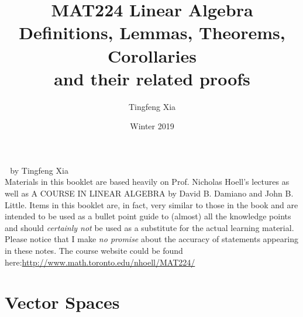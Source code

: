 \documentclass[oneside, 12pt]{book}
\title{%
  \textbf{MAT224 Linear Algebra}\\
  \large Definitions, Lemmas, Theorems, Corollaries \\
    and their related proofs}
\author{Tingfeng Xia}
\date{Winter 2019}
\newcommand{\tit}[1]{\textit{#1}}
\begin{document}
\frontmatter
\maketitle
\newpage %
\mbox{}
\vfill
\doclicenseThis
\noindent \maltese \,\, by Tingfeng Xia \\


\noindent Materials in this booklet are based heavily on Prof. Nicholas Hoell's lectures as well as 
A COURSE IN LINEAR ALGEBRA by David B. Damiano and John B. Little.\newline\newline
Items in this booklet are, in fact, very similar to those in the book and are intended to be used as a bullet point guide to (almost) all the knowledge points and should \tit{certainly not} be used as a substitute for the actual learning material. Please notice that I make\tit{ no promise} about the accuracy of statements appearing in these notes.\newline\newline
The course website could be found here:\newline \url{http://www.math.toronto.edu/nhoell/MAT224/}
\newpage

\tableofcontents

\mainmatter

\chapter{Vector Spaces}
\end{document}
